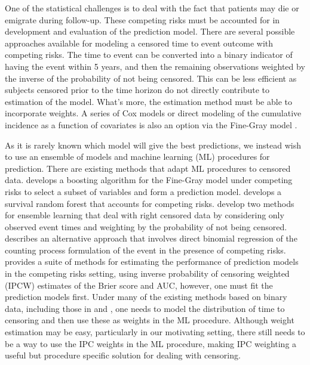 \documentclass{statsoc}
\begin{document}
One of the statistical challenges is to deal with the fact that patients may die or emigrate during follow-up. These competing risks must be accounted for in development and evaluation of the prediction model. There are several possible approaches available for modeling a censored time to event outcome with competing risks. The time to event can be converted into a binary indicator of having the event within 5 years, and then the remaining observations weighted by the inverse of the probability of not being censored. This can be less efficient as subjects censored prior to the time horizon do not directly contribute to estimation of the model. What's more, the estimation method must be able to incorporate weights. A series of Cox models or direct modeling of the cumulative incidence as a function of covariates is also an option via the Fine-Gray model \citep{fine1999proportional}. 

As it is rarely known which model will give the best predictions, we instead wish to use an ensemble of models and machine learning (ML) procedures for prediction. There are existing methods that adapt ML procedures to censored data. \citet{binder2009boosting} develops a boosting algorithm for the Fine-Gray model under competing risks to select a subset of variables and form a prediction model. \citet{ishwaran2014random} develops a survival random forest that accounts for competing risks. \citet{hothorn2005survival} develop two methods for ensemble learning that deal with right censored data by considering only observed event times and weighting by the probability of not being censored. \citet{scheike2008predicting} describes an alternative approach that involves direct binomial regression of the counting process formulation of the event in the presence of competing risks. \citet{gerds2018} provides a suite of methods for estimating the performance of prediction models in the competing risks setting, using inverse probability of censoring weighted (IPCW) estimates of the Brier score and AUC, however, one must fit the prediction models first. Under many of the existing methods based on binary data, including those in \citet{scheike2008predicting} and \citet{hothorn2005survival}, one needs to model the distribution of time to censoring and then use these as weights in the ML procedure. Although weight estimation may be easy, particularly in our motivating setting, there still needs to be a way to use the IPC weights in the ML procedure, making IPC weighting a useful but procedure specific solution for dealing with censoring. 
\end{document}
